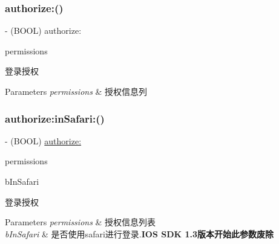 \subsubsection{\texorpdfstring{authorize\+:()}{authorize:()}\hspace{0.1cm}{\footnotesize\ttfamily [2/2]}}
{\footnotesize\ttfamily -\/ (B\+O\+OL) authorize\+: \begin{DoxyParamCaption}\item[{(N\+S\+Array $\ast$)}]{permissions }\end{DoxyParamCaption}}

登录授权


\begin{DoxyParams}{Parameters}
{\em permissions} & 授权信息列 \\
\hline
\end{DoxyParams}
\mbox{\label{interface_tencent_o_auth_a6e5dc1555fb4a0fe063dfff83b12c9e5}} 
\subsubsection{\texorpdfstring{authorize\+:in\+Safari\+:()}{authorize:inSafari:()}\hspace{0.1cm}{\footnotesize\ttfamily [1/2]}}
{\footnotesize\ttfamily -\/ (B\+O\+OL) \mbox{\hyperlink{interface_tencent_o_auth_a996be450c28db1855873e0853b9fcf27}{authorize\+:}} \begin{DoxyParamCaption}\item[{(N\+S\+Array $\ast$)}]{permissions }\item[{inSafari:(B\+O\+OL)}]{b\+In\+Safari }\end{DoxyParamCaption}}

登录授权 
\begin{DoxyParams}{Parameters}
{\em permissions} & 授权信息列表 \\
\hline
{\em b\+In\+Safari} & 是否使用safari进行登录.{\bfseries I\+OS S\+DK 1.\+3版本开始此参数废除} \\
\hline
\end{DoxyParams}
\mbox{\label{interface_tencent_o_auth_a6e5dc1555fb4a0fe063dfff83b12c9e5}} 
